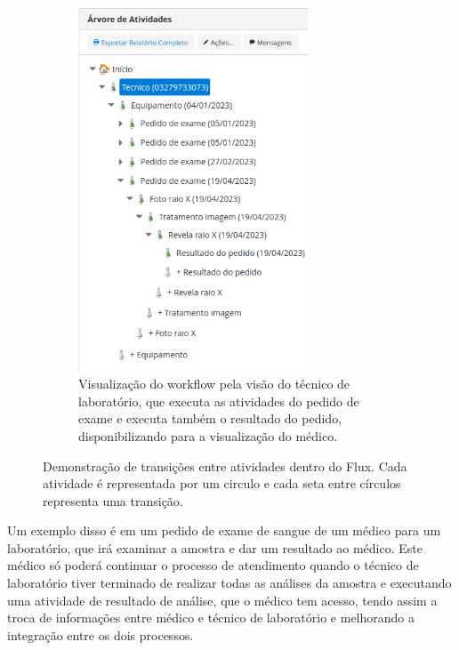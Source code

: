 \begin{figure}
\begin{subfigure}[b]{0.45\textwidth}
        \includegraphics[width=0.75\textwidth]{imgs/Exemplo-Mestrado/arvore_tecnico.png}
        \caption{Visualização do workflow pela visão do técnico de laboratório, que executa as atividades do pedido de exame e executa também o resultado do pedido, disponibilizando para a visualização do médico.}
        \label{fig:arvore_tecnico}
    \end{subfigure}
    \caption{Demonstração de transições entre atividades dentro do Flux. Cada atividade é representada por um circulo e cada seta entre círculos representa uma transição.}
    \label{fig:arvore_medico_tecnico}

\end{figure}

Um exemplo disso é em um pedido de exame de sangue de um médico para um laboratório, que irá examinar a amostra e dar um resultado ao médico. Este médico só poderá continuar o processo de atendimento quando o técnico de laboratório tiver terminado de realizar todas as análises da amostra e executando uma atividade de resultado de análise, que o médico tem acesso, tendo assim a troca de informações entre médico e técnico de laboratório e melhorando a integração entre os dois processos.

